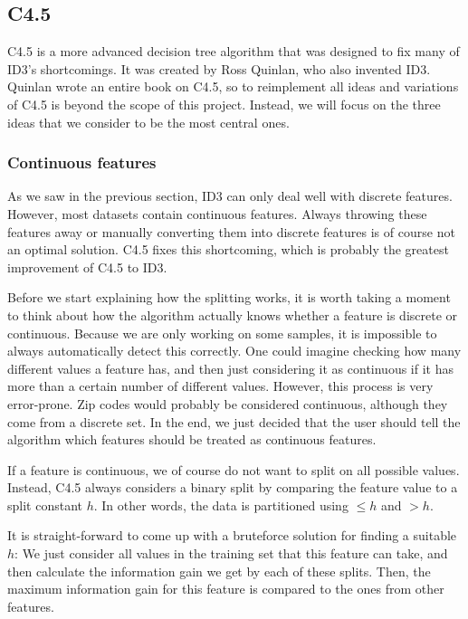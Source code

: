 \documentclass[a4paper]{article}
\begin{document}
\subsection{C4.5}
\label{subsec:c45}

C4.5 is a more advanced decision tree algorithm that was designed to fix many of ID3's shortcomings. It was created by Ross Quinlan, who also invented ID3. Quinlan wrote an entire book on C4.5, so to reimplement all ideas and variations of C4.5 is beyond the scope of this project. Instead, we will focus on the three ideas that we consider to be the most central ones.

\subsubsection{Continuous features}

As we saw in the previous section, ID3 can only deal well with discrete features. However, most datasets contain continuous features. Always throwing these features away or manually converting them into discrete features is of course not an optimal solution. C4.5 fixes this shortcoming, which is probably the greatest improvement of C4.5 to ID3.

Before we start explaining how the splitting works, it is worth taking a moment to think about how the algorithm actually knows whether a feature is discrete or continuous. Because we are only working on some samples, it is impossible to always automatically detect this correctly. One could imagine checking how many different values a feature has, and then just considering it as continuous if it has more than a certain number of different values. However, this process is very error-prone. Zip codes would probably be considered continuous, although they come from a discrete set. In the end, we just decided that the user should tell the algorithm which features should be treated as continuous features.

If a feature is continuous, we of course do not want to split on all possible values. Instead, C4.5 always considers a binary split by comparing the feature value to a split constant $h$. In other words, the data is partitioned using $\le h$ and $> h$.

It is straight-forward to come up with a bruteforce solution for finding a suitable $h$: We just consider all values in the training set that this feature can take, and then calculate the information gain we get by each of these splits. Then, the maximum information gain for this feature is compared to the ones from other features.
\end{document}
